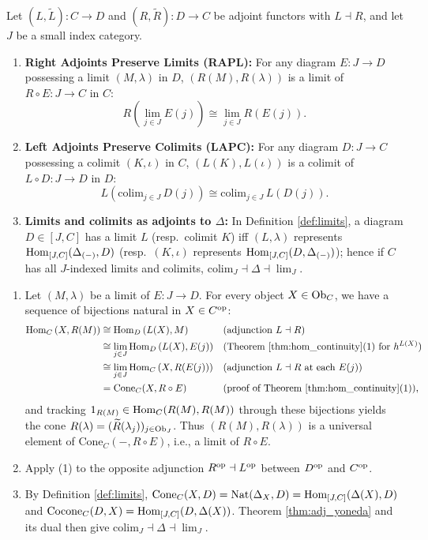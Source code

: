 \documentclass[10pt,a4paper]{article}
\begin{document}
\begin{theorem}\label{thm:rapl_lapc}
Let $(L, \widetilde{L}) : C \to D$ and $(R, \widetilde{R}) : D \to C$ be adjoint functors with $L \dashv R$, and let $J$ be a small index category.
\begin{enumerate}
\item \textbf{Right Adjoints Preserve Limits (RAPL):} For any diagram $E : J \to D$ possessing a limit $(M, \lambda)$ in $D$, $(R(M), R(\lambda))$ is a limit of $R \circ E : J \to C$ in $C$:
$$R\left(\lim_{j \in J} E(j)\right) \cong \lim_{j \in J} R(E(j)).$$
\item \textbf{Left Adjoints Preserve Colimits (LAPC):} For any diagram $D : J \to C$ possessing a colimit $(K, \iota)$ in $C$, $(L(K), L(\iota))$ is a colimit of $L \circ D : J \to D$ in $D$:
$$L\left(\mathrm{colim}_{j \in J}\, D(j)\right) \cong \mathrm{colim}_{j \in J}\, L(D(j)).$$
\item \textbf{Limits and colimits as adjoints to $\Delta$:} In Definition \ref{def:limits}, a diagram $D \in [J, C]$ has a limit $L$ (resp.\ colimit $K$) iff $(L, \lambda)$ represents ${\textrm{Hom}}_{[J,C]}(\Delta_{(-)}, D)$ (resp.\ $(K, \iota)$ represents ${\textrm{Hom}}_{[J,C]}(D, \Delta_{(-)})$); hence if $C$ has all $J$-indexed limits and colimits, $\mathrm{colim}_J \dashv \Delta \dashv \lim_J$.
\end{enumerate}
\end{theorem}
\myprf
\begin{enumerate}
\item Let $(M, \lambda)$ be a limit of $E : J \to D$. For every object $X \in {\textrm{Ob}}_C$, we have a sequence of bijections natural in $X \in C^{\textrm{op}}$:
\begin{align*}
{\textrm{Hom}}_C\left(X, R(M)\right) &\cong {\textrm{Hom}}_D\left(L(X), M\right) && \text{(adjunction $L \dashv R$)} \\
&\cong \lim_{j \in J} {\textrm{Hom}}_D\left(L(X), E(j)\right) && \text{(Theorem \ref{thm:hom_continuity}(1) for $h^{L(X)}$)} \\
&\cong \lim_{j \in J} {\textrm{Hom}}_C\left(X, R(E(j))\right) && \text{(adjunction $L \dashv R$ at each $E(j)$)} \\
&= \mathrm{Cone}_C(X, R \circ E) && \text{(proof of Theorem \ref{thm:hom_continuity}(1))},
\end{align*}
and tracking $1_{R(M)} \in {\textrm{Hom}}_C(R(M), R(M))$ through these bijections yields the cone $R(\lambda) = (\widetilde{R}(\lambda_j))_{j \in {\textrm{Ob}}_J}$. Thus $(R(M), R(\lambda))$ is a universal element of $\mathrm{Cone}_C(-, R \circ E)$, i.e., a limit of $R \circ E$.
\item Apply (1) to the opposite adjunction $R^{\textrm{op}} \dashv L^{\textrm{op}}$ between $D^{\textrm{op}}$ and $C^{\textrm{op}}$.
\item By Definition \ref{def:limits}, $\mathrm{Cone}_C(X, D) = {\textrm{Nat}}(\Delta_X, D) = {\textrm{Hom}}_{[J,C]}(\Delta(X), D)$ and $\mathrm{Cocone}_C(D, X) = {\textrm{Hom}}_{[J,C]}(D, \Delta(X))$. Theorem \ref{thm:adj_yoneda} and its dual then give $\mathrm{colim}_J \dashv \Delta \dashv \lim_J$.
\end{enumerate}
\myqed
\end{document}
